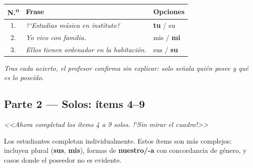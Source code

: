 \documentclass[a4paper,10pt]{article}
\renewcommand{\arraystretch}{1.3}
\newcommand{\pos}[1]{\textbf{\textcolor{purpura}{#1}}}
\begin{document}
\renewcommand{\arraystretch}{1.8}
\begin{center}
\begin{tabular}{|c p{7.5cm} p{4.5cm}|}
\hline
\rowcolor{purpura!8}
\textbf{N.\textsuperscript{o}} & \textbf{Frase} & \textbf{Opciones} \\
\hline
1. & \textit{?`Estudias m\'usica en \underline{\hspace{1.5cm}} instituto?} & \textbf{\pos{tu}} / su \\
\hline
2. & \textit{Yo vivo con \underline{\hspace{1.5cm}} familia.} & mis / \textbf{\pos{mi}} \\
\hline
3. & \textit{Ellos tienen \underline{\hspace{1.5cm}} ordenador en la habitaci\'on.} & sus / \textbf{\pos{su}} \\
\hline
\end{tabular}
\end{center}

\vspace{0.3cm}

\textit{Tras cada acierto, el profesor confirma sin explicar: solo se\~{n}ala qui\'en posee y qu\'e es lo pose\'ido.}

\vspace{0.6cm}


\subsection*{\textcolor{purpura}{Parte 2 --- Solos: \'items 4--9}}

\begin{tcolorbox}[colback=gris, colframe=purpura!50, arc=3pt, boxrule=0.5pt]
\textit{<<Ahora completad los \'items 4 a 9 solos. !`Sin mirar el cuadro!>>}
\end{tcolorbox}

\vspace{0.3cm}

Los estudiantes completan individualmente. Estos \'items son m\'as complejos: incluyen plural (\pos{sus}, \pos{mis}), formas de \pos{nuestro/-a} con concordancia de g\'enero, y casos donde el poseedor no es evidente.

\vspace{0.3cm}
\end{document}
